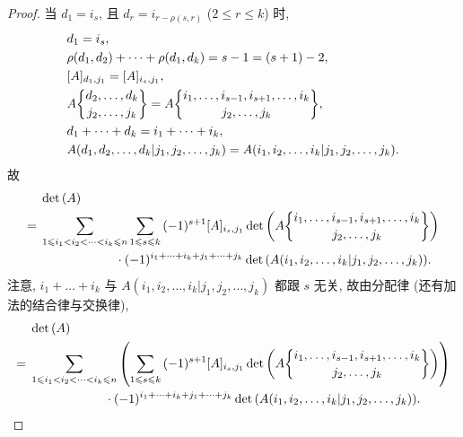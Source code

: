 \documentclass[../libro.tex]{subfiles}
\begin{document}
\begin{proof}
    当 \(d_1 = i_s\),
    且 \(d_r = i_{r - \rho(s, r)}\)
    (\(2 \leq r \leq k\)) 时,
    \begin{align*}
        &
        d_1 = i_s,
        \\
        &
        \rho(d_1, d_2) + \dots + \rho(d_1, d_k)
        = s - 1 = (s + 1) - 2,
        \\
        &
        [A]_{d_1,j_1} = [A]_{i_s,j_1},
        \\
        &
        A\submat{d_2, \dots, d_k}{j_2, \dots, j_k}
        =
        A\submat{i_1, \dots, i_{s-1}, i_{s+1}, \dots, i_k}
        {j_2, \dots, j_k},
        \\
        &
        d_1 + \dots + d_k = i_1 + \dots + i_k,
        \\
        &
        A({d_1,d_2,\dots,d_k}|{j_1,j_2,\dots,j_k})
        =
        A({i_1,i_2,\dots,i_k}|{j_1,j_2,\dots,j_k}).
    \end{align*}
    故
    \begin{align*}
        &
        \det {(A)}
        \\
        = {} &
        \sum_{1 \leq i_1 < i_2 < \dots < i_k \leq n}
        {\sum_{1 \leq s \leq k}
            {(-1)^{s+1} [A]_{i_s,j_1}
                \det {\left(
                        A\submat{i_1, \dots, i_{s-1},
                        i_{s+1}, \dots, i_k}
                        {j_2, \dots, j_k}
        \right)}}}
        \\
        &
        \qquad \qquad \qquad
        \cdot
        (-1)^{i_1 + \dots + i_k + j_1 + \dots + j_k}
        \det {(A({i_1,i_2,\dots,i_k}|{j_1,j_2,\dots,j_k}))}.
    \end{align*}
    注意, \(i_1 + \dots + i_k\) 与
    \(A({i_1,i_2,\dots,i_k}|{j_1,j_2,\dots,j_k})\)
    都跟 \(s\) 无关,
    故由分配律 (还有加法的结合律与交换律),
    \begin{align*}
        &
        \det {(A)}
        \\
        = {} &
        \sum_{1 \leq i_1 < i_2 < \dots < i_k \leq n}
        {\left(
                \sum_{1 \leq s \leq k}
                {(-1)^{s+1} [A]_{i_s,j_1}
                    \det {\left(
                            A\submat{i_1, \dots, i_{s-1},
                            i_{s+1}, \dots, i_k}
                            {j_2, \dots, j_k}
                \right)}}
        \right)}
        \\
        &
        \qquad \qquad \qquad
        \cdot
        (-1)^{i_1 + \dots + i_k + j_1 + \dots + j_k}
        \det {(A({i_1,i_2,\dots,i_k}|{j_1,j_2,\dots,j_k}))}.

\end{align*}
\end{proof}
\end{document}
